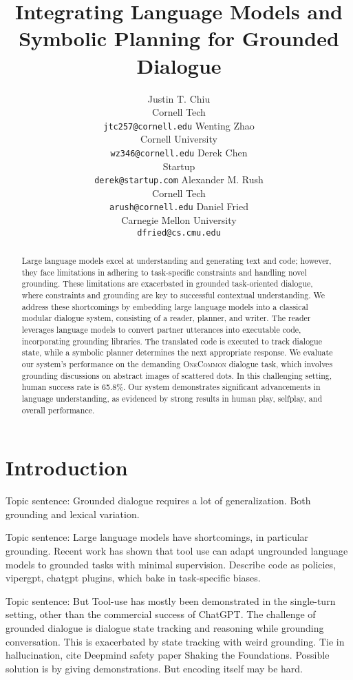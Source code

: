 \documentclass[11pt]{article}
\title{
Integrating Language Models and Symbolic Planning for Grounded Dialogue
}
\author{
Justin T. Chiu  \\
Cornell Tech \\
\texttt{jtc257@cornell.edu}
\And
Wenting Zhao \\
Cornell University \\
\texttt{wz346@cornell.edu}
\And
Derek Chen \\
Startup \\
\texttt{derek@startup.com}
\And
Alexander M. Rush \\
Cornell Tech \\
\texttt{arush@cornell.edu}
\And
Daniel Fried \\
Carnegie Mellon University \\
\texttt{dfried@cs.cmu.edu} 
}
\begin{document}
\maketitle
\begin{abstract}
Large language models excel at understanding and generating text and code; however,
they face limitations in adhering to task-specific constraints and handling novel grounding.
These limitations are exacerbated in grounded task-oriented dialogue,
where constraints and grounding are key to successful contextual understanding.
We address these shortcomings by embedding large language models
into a classical modular dialogue system,
consisting of a reader, planner, and writer.
The reader leverages language models to convert partner utterances into executable code,
incorporating grounding libraries.
The translated code is executed to track dialogue state,
while a symbolic planner determines the next appropriate response.
We evaluate our system's performance on the demanding \textsc{OneCommon} dialogue task,
which involves grounding discussions on abstract images of scattered dots.
In this challenging setting, human success rate is 65.8\%.
Our system demonstrates significant advancements in language understanding,
as evidenced by strong results in human play, selfplay, and overall performance.
\end{abstract}

\section{Introduction}
Topic sentence: Grounded dialogue requires a lot of generalization.
Both grounding and lexical variation.

Topic sentence: Large language models have shortcomings, in particular grounding.
Recent work has shown that tool use can adapt ungrounded language models
to grounded tasks with minimal supervision.
Describe code as policies, vipergpt, chatgpt plugins,
which bake in task-specific biases.

Topic sentence: But Tool-use has mostly been demonstrated in the single-turn setting,
other than the commercial success of ChatGPT.
The challenge of grounded dialogue is dialogue state tracking and reasoning while
grounding conversation.
This is exacerbated by state tracking with weird grounding.
Tie in hallucination, cite Deepmind safety paper Shaking the Foundations.
Possible solution is by giving demonstrations.
But encoding itself may be hard.
\end{document}
